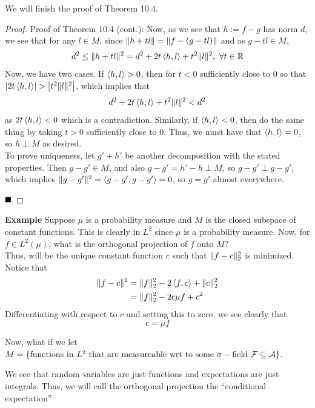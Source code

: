 
We will finish the proof of Theorem 10.4.
\vspace{0.4cm}

\begin{proof}{Proof of Theorem 10.4 (cont.):}
    Now, as we see that $h := f - g$ has norm $d$, we see that for any $l \in M$, since $\norm{h + tl} = \norm{f - (g - tl)}$ and as $g - tl \in M$,  
    \[ d^2 \leq \norm{h + tl}^2 = d^2 + 2t\brac{h, l} + t^2\norm{l}^2,\ \forall t \in \R \]
    Now, we have two cases. If $\brac{h, l} > 0$, then for $t < 0$ sufficiently close to $0$ so that $\abs{2t\brac{h, l}} > \abs{t^2\norm{l}^2}$, which implies that
    \[ d^2 + 2t\brac{h, l} + t^2\norm{l}^2 < d^2 \]
    as $2t\brac{h, l} < 0$ which is a contradiction. Similarly, if $\brac{h, l} < 0$, then do the same thing by taking $t > 0$ sufficiently close to $0$. Thus, we must have that $\brac{h, l} = 0$, so $h \perp M$ as desired. \\

    To prove uniqueness, let $g' + h'$ be another decomposition with the stated properties. Then $g - g' \in M$, and also $g - g' = h' - h \perp M$, so $g - g' \perp g - g'$, which implies $\norm{g - g'}^2 = \brac{g - g', g - g'} = 0$, so $g = g'$ almost everywhere. 

    $\qed$
\end{proof}

\begin{example}{\textbf{Example}}
    Suppose $\mu$ is a probability measure and $M$ is the closed subspace of constant functions. This is clearly in $L^2$ since $\mu$ is a probability measure. Now, for $f \in L^2(\mu)$, what is the orthogonal projection of $f$ onto $M$?\\

    Thus, will be the unique constant function $c$ such that $\norm{f - c}_{2}^{2}$ is minimized. Notice that
    \begin{align*}
        \norm{f - c}^2 &= \norm{f}_{2}^{2} - 2\brac{f, c} + \norm{c}_{2}^{2}\\
        &= \norm{f}_{2}^{2} - 2c\mu f + c^2\\
    \end{align*}
    Differentiating with respect to $c$ and setting this to zero, we see clearly that
    \[ c = \mu f \]

    Now, what if we let $M = \{\tt{functions in }L^2 \tt{ that are measureable wrt to some } \sigma-\tt{field } \cal{F} \subseteq \cal{A}\}$.\\

\end{example}
We see that random variables are just functions and expectations are just integrals. Thus, we will call the orthogonal projection the ``conditional expectation''

